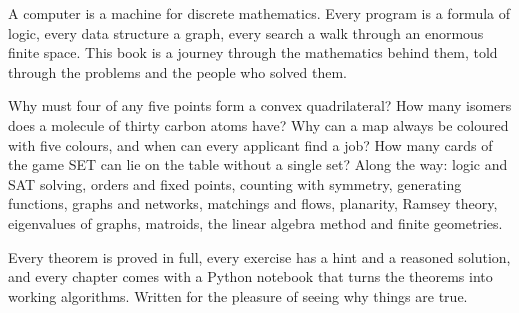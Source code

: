 A computer is a machine for discrete mathematics. Every program is a formula of logic, every data structure a graph,
every search a walk through an enormous finite space. This book is a journey through the mathematics behind them,
told through the problems and the people who solved them.

Why must four of any five points form a convex quadrilateral? How many isomers does a molecule of thirty carbon
atoms have? Why can a map always be coloured with five colours, and when can every applicant find a job? How many cards
of the game SET can lie on the table without a single set? Along the way: logic and SAT solving,
orders and fixed points, counting with symmetry, generating functions, graphs and networks, matchings and flows,
planarity, Ramsey theory, eigenvalues of graphs, matroids, the linear algebra method and finite geometries.

Every theorem is proved in full, every exercise has a hint and a reasoned solution, and every chapter comes with a
Python notebook that turns the theorems into working algorithms. Written for the pleasure of seeing why things are
true.

